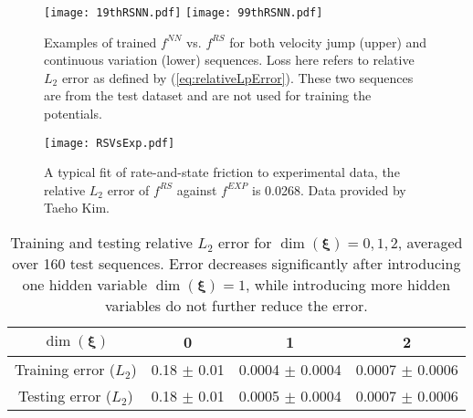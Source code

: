 \begin{figure}[htb!]
    \centering
    \texttt{[image: 19thRSNN.pdf]}
    \texttt{[image: 99thRSNN.pdf]}
    \caption{Examples of trained $f^{NN}$ vs. $f^{RS}$ for both velocity jump (upper) and continuous variation (lower) sequences. 
    Loss here refers to relative $L_2$ error as defined by (\ref{eq:relativeLpError}). 
    These two sequences are from the test dataset and are not used for training the potentials.}
    \label{fig:19thAnd99thRSNN}
\end{figure}

\begin{figure}[htb!]
    \centering
    \texttt{[image: RSVsExp.pdf]}
    \caption{A typical fit of rate-and-state friction to experimental data, 
    the relative $L_2$ error of $f^{RS}$ against $f^{EXP}$ is 0.0268. 
    Data provided by Taeho Kim.}
    \label{fig:RSVsExp}
\end{figure}

\begin{table}[htb!]
    \centering
    \begin{tabular}{cccc}
        \hline
        $\dim(\bm{\xi})$ & 0 & 1 & 2 \\
        \hline
        Training error ($L_2$) & 0.18 $\pm$ 0.01 & 0.0004 $\pm$ 0.0004 & 0.0007 $\pm$ 0.0006\\
        Testing error ($L_2$) & 0.18 $\pm$ 0.01 & 0.0005 $\pm$ 0.0004 & 0.0007 $\pm$ 0.0006 \\
        \hline
    \end{tabular}
    \caption{Training and testing relative $L_2$ error for $\dim(\bm{\xi}) = 0, 1, 2$, 
    averaged over 160 test sequences. 
    Error decreases significantly after introducing one hidden variable $\dim(\bm{\xi}) = 1$, 
    while introducing more hidden variables do not further reduce the error. }
    \label{tab:dimXi}
\end{table}

